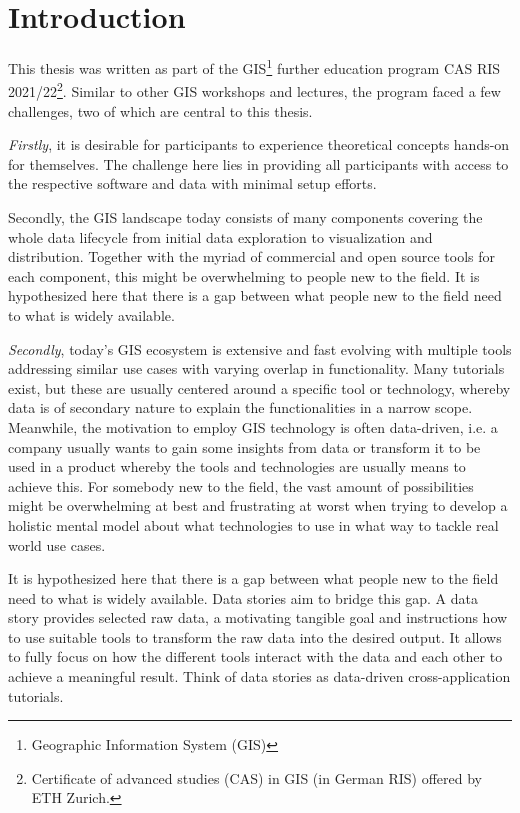 \documentclass[11pt, a4paper, oneside, parskip=full-]{scrartcl}
\begin{document}
\newpage
\tableofcontents

\newpage
{}
\setcounter{page}{1}
\section{Introduction}

This thesis was written as part of the GIS\footnote{Geographic Information
System (GIS)} further education program CAS RIS 2021/22\footnote{Certificate of
advanced studies (CAS) in GIS (in German RIS) offered by ETH Zurich.}. Similar
to other GIS workshops and lectures, the program faced a few challenges, two of
which are central to this thesis.

\emph{Firstly}, it is desirable for participants to experience theoretical concepts
hands-on for themselves. The challenge here lies in providing all participants
with access to the respective software and data with minimal setup efforts.


Secondly, the GIS landscape today consists of many components covering the whole
data lifecycle from initial data exploration to visualization and distribution.
Together with the myriad of commercial and open source tools for each component,
this might be overwhelming to people new to the field. It is hypothesized here
that there is a gap between what people new to the field need to what is widely
available.

\emph{Secondly}, today's GIS ecosystem is extensive and fast evolving with
multiple tools addressing similar use cases with varying overlap in
functionality. Many tutorials exist, but these are usually centered around a
specific tool or technology, whereby data is of secondary nature to explain the
functionalities in a narrow scope. Meanwhile, the motivation to employ GIS
technology is often data-driven, i.e. a company usually wants to gain some
insights from data or transform it to be used in a product whereby the tools and
technologies are usually means to achieve this. For somebody new to the field,
the vast amount of possibilities might be overwhelming at best and frustrating
at worst when trying to develop a holistic mental model about what technologies
to use in what way to tackle real world use cases.

It is hypothesized here that there is a gap between what people new to the field
need to what is widely available. Data stories aim to bridge this gap. A data
story provides selected raw data, a motivating tangible goal and instructions
how to use suitable tools to transform the raw data into the desired output. It
allows to fully focus on how the different tools interact with the data and each
other to achieve a meaningful result. Think of data stories as data-driven
cross-application tutorials.
\end{document}
